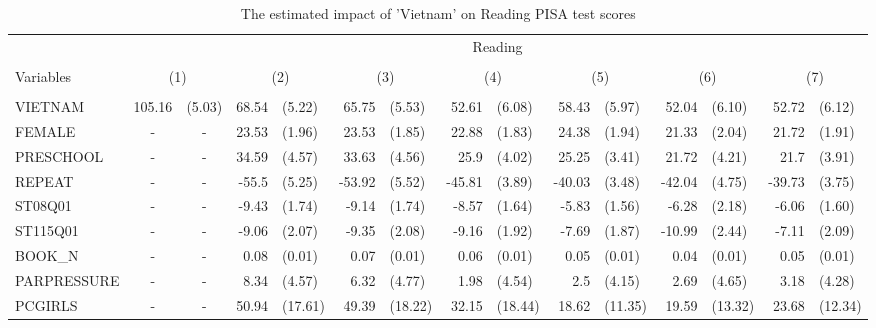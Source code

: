 \documentclass[10pt]{article}
\begin{document}
	
	\begin{table}[htbp]
		\footnotesize
		\def\arraystretch{1}
		\def\tabcolsep{4}
		\centering
		\caption{The estimated impact of 'Vietnam' on Reading PISA test scores}
		\begin{tabular}{lrlrlrlrlrlrlrl}
			\toprule
			\midrule
			& \multicolumn{14}{c}{Reading} \\
			\cline{2-15} \\
			Variables & \multicolumn{2}{c}{(1)} & \multicolumn{2}{c}{(2)} & \multicolumn{2}{c}{(3)} & \multicolumn{2}{c}{(4)} & \multicolumn{2}{c}{(5)} & \multicolumn{2}{c}{(6)} & \multicolumn{2}{c}{(7)} \\
			\hline\\
			
 VIETNAM & 105.16 & (5.03) & 68.54 & (5.22) & 65.75 & (5.53) & 52.61 & (6.08) & 58.43 & (5.97) & 52.04 & (6.10) & 52.72 & (6.12) \\[0.2em]
 FEMALE & \multicolumn{1}{c}{-} & \multicolumn{1}{c}{-} & 23.53 & (1.96) & 23.53 & (1.85) & 22.88 & (1.83) & 24.38 & (1.94) & 21.33 & (2.04) & 21.72 & (1.91) \\[0.2em]
 PRESCHOOL & \multicolumn{1}{c}{-} & \multicolumn{1}{c}{-} & 34.59 & (4.57) & 33.63 & (4.56) & 25.9  & (4.02) & 25.25 & (3.41) & 21.72 & (4.21) & 21.7  & (3.91) \\[0.2em]
 REPEAT & \multicolumn{1}{c}{-} & \multicolumn{1}{c}{-} & -55.5 & (5.25) & -53.92 & (5.52) & -45.81 & (3.89) & -40.03 & (3.48) & -42.04 & (4.75) & -39.73 & (3.75) \\[0.2em]
 ST08Q01 & \multicolumn{1}{c}{-} & \multicolumn{1}{c}{-} & -9.43 & (1.74) & -9.14 & (1.74) & -8.57 & (1.64) & -5.83 & (1.56) & -6.28 & (2.18) & -6.06 & (1.60) \\[0.2em]
 ST115Q01 & \multicolumn{1}{c}{-} & \multicolumn{1}{c}{-} & -9.06 & (2.07) & -9.35 & (2.08) & -9.16 & (1.92) & -7.69 & (1.87) & -10.99 & (2.44) & -7.11 & (2.09) \\[0.2em]
 BOOK\_N & \multicolumn{1}{c}{-} & \multicolumn{1}{c}{-} & 0.08  & (0.01) & 0.07  & (0.01) & 0.06  & (0.01) & 0.05  & (0.01) & 0.04  & (0.01) & 0.05  & (0.01) \\[0.2em]
 PARPRESSURE & \multicolumn{1}{c}{-} & \multicolumn{1}{c}{-} & 8.34  & (4.57) & 6.32  & (4.77) & 1.98  & (4.54) & 2.5   & (4.15) & 2.69  & (4.65) & 3.18  & (4.28) \\[0.2em]
 PCGIRLS & \multicolumn{1}{c}{-} & \multicolumn{1}{c}{-} & 50.94 & (17.61) & 49.39 & (18.22) & 32.15 & (18.44) & 18.62 & (11.35) & 19.59 & (13.32) & 23.68 & (12.34) \\[0.2em]

\end{tabular}
\end{table}
\end{document}
